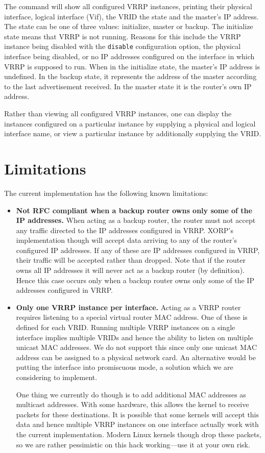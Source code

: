 The command will show all configured VRRP instances, printing their physical
interface, logical interface (Vif), the VRID the state and the master's IP
address.  The state can be one of three values: initialize, master or backup.
The initialize state means that VRRP is not running.  Reasons for this include
the VRRP instance being disabled with the {\tt disable} configuration option,
the physical interface being disabled, or no IP addresses configured on the
interface in which VRRP is supposed to run.  When in the initialize state, the
master's IP address is undefined.  In the backup state, it represents the
address of the master according to the last advertisement received.  In the
master state it is the router's own IP address.

Rather than viewing all configured VRRP instances, one can display the instances
configured on a particular instance by supplying a physical and logical interface
name, or view a particular instance by additionally supplying the VRID.

\section{Limitations}
The current implementation has the following known limitations:
\begin{itemize}
\item {\bf Not RFC compliant when a backup router owns only some of the IP
addresses.}  When acting as a backup router, the router must not accept any
traffic directed to the IP addresses configured in VRRP.  XORP's implementation
though will accept data arriving to any of the router's configured IP addresses.
If any of these are IP addresses configured in VRRP, their traffic will be
accepted rather than dropped.  Note that if the router owns all IP addresses it
will never act as a backup router (by definition).  Hence this case occurs only
when a backup router owns only some of the IP addresses configured in VRRP.

\item {\bf Only one VRRP instance per interface.}  Acting as a VRRP router
requires listening to a special virtual router MAC address.  One of these is
defined for each VRID.  Running multiple VRRP instances on a single interface
implies multiple VRIDs and hence the ability to listen on multiple unicast MAC
addresses.  We do not support this since only one unicast MAC address can be
assigned to a physical network card.  An alternative would be putting the
interface into promiscuous mode, a solution which we are considering to
implement.

One thing we currently do though is to add additional MAC addresses as multicast
addresses.  With some hardware, this allows the kernel to receive packets for
these destinations.  It is possible that some kernels will accept this data and
hence multiple VRRP instances on one interface actually work with the current
implementation.  Modern Linux kernels though drop these packets, so we are
rather pessimistic on this hack working---use it at your own risk.
\end{itemize}
